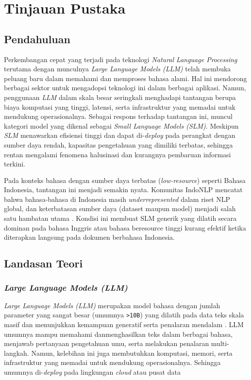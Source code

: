 \chapter{Tinjauan Pustaka}

\section{Pendahuluan}
Perkembangan cepat yang terjadi pada teknologi \textit{Natural Language Processing} terutama dengan munculnya \textit{Large Language Models (LLM)} telah membuka peluang baru dalam memahami dan memproses bahasa alami. Hal ini mendorong berbagai sektor untuk mengadopsi teknologi ini dalam berbagai aplikasi. Namun, penggunaan \textit{LLM} dalam skala besar seringkali menghadapi tantangan berupa biaya komputasi yang tinggi, latensi, serta infrastruktur yang memadai untuk mendukung operasionalnya. Sebagai respons terhadap tantangan ini, muncul kategori model yang dikenal sebagai \textit{Small Language Models (SLM)}. Meskipun \textit{SLM} menawarkan efisiensi tinggi dan dapat di-\textit{deploy} pada perangkat dengan sumber daya rendah, kapasitas pengetahuan yang dimiliki terbatas, sehingga rentan mengalami fenomena halusinasi dan kurangnya pembaruan informasi terkini.

Pada konteks bahasa dengan sumber daya terbatas (\textit{low-resource}) seperti Bahasa Indonesia, tantangan ini menjadi semakin nyata. Komunitas IndoNLP mencatat bahwa bahasa-bahasa di Indonesia masih \textit{underrepresented} dalam riset NLP global, dan keterbatasan sumber daya (dataset maupun model) menjadi salah satu hambatan utama \citep{indonlp2022}. Kondisi ini membuat SLM generik yang dilatih secara dominan pada bahasa Inggris atau bahasa beresource tinggi kurang efektif ketika diterapkan langsung pada dokumen berbahasa Indonesia.
\section{Landasan Teori}
\subsection{\textit{Large Language Models (LLM)}}

\textit{Large Language Models (LLM)} merupakan model bahasa dengan jumlah parameter yang sangat besar (umumnya \texttt{>10B}) yang dilatih pada data teks skala masif dan menunjukkan kemampuan generatif serta penalaran mendalam \citep{zhao2023survey}. LLM umumnya mampu memahami danmenghasilkan teks dalam berbagai bahasa, menjawab pertanyaan pengetahuan umu, serta melakukan penalaran multi-langkah. Namun, kelebihan ini juga membutuhkan komputasi, memori, serta infrastruktur yang memadai untuk mendukung operasionalnya. Sehingga umumnya di-\textit{deploy} pada lingkungan \textit{cloud} atau pusat data \cite{lu2025slm}

